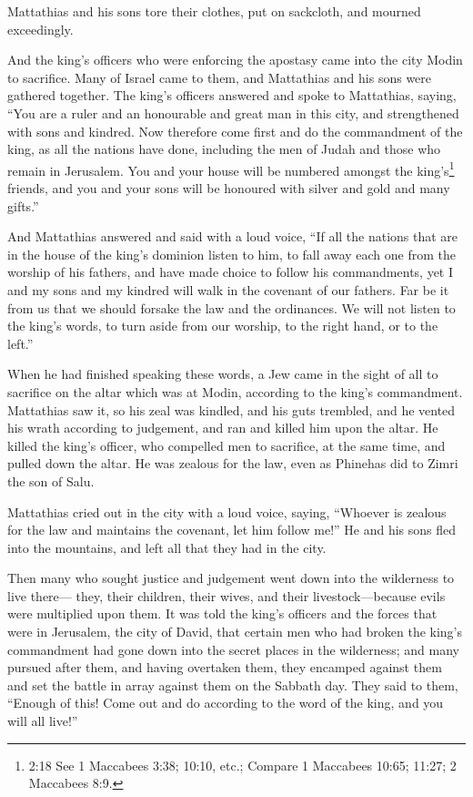  Mattathias and his sons tore their clothes, put on
sackcloth, and mourned exceedingly.

 And the king's officers who were enforcing the apostasy
came into the city Modin to sacrifice.  Many of Israel came
to them, and Mattathias and his sons were gathered together.
 The king's officers answered and spoke to Mattathias,
saying, ``You are a ruler and an honourable and great man in this city,
and strengthened with sons and kindred.  Now therefore come
first and do the commandment of the king, as all the nations have done,
including the men of Judah and those who remain in Jerusalem. You and
your house will be numbered amongst the king's\footnote{2:18 See 1
  Maccabees 3:38; 10:10, etc.; Compare 1 Maccabees 10:65; 11:27; 2
  Maccabees 8:9.} friends, and you and your sons will be honoured with
silver and gold and many gifts.''

 And Mattathias answered and said with a loud voice, ``If
all the nations that are in the house of the king's dominion listen to
him, to fall away each one from the worship of his fathers, and have
made choice to follow his commandments,  yet I and my sons
and my kindred will walk in the covenant of our fathers. 
Far be it from us that we should forsake the law and the ordinances.
 We will not listen to the king's words, to turn aside from
our worship, to the right hand, or to the left.''

 When he had finished speaking these words, a Jew came in
the sight of all to sacrifice on the altar which was at Modin, according
to the king's commandment.  Mattathias saw it, so his zeal
was kindled, and his guts trembled, and he vented his wrath according to
judgement, and ran and killed him upon the altar.  He
killed the king's officer, who compelled men to sacrifice, at the same
time, and pulled down the altar.  He was zealous for the
law, even as Phinehas did to Zimri the son of Salu.

 Mattathias cried out in the city with a loud voice,
saying, ``Whoever is zealous for the law and maintains the covenant, let
him follow me!''  He and his sons fled into the mountains,
and left all that they had in the city.

 Then many who sought justice and judgement went down into
the wilderness to live there---  they, their children,
their wives, and their livestock---because evils were multiplied upon
them.  It was told the king's officers and the forces that
were in Jerusalem, the city of David, that certain men who had broken
the king's commandment had gone down into the secret places in the
wilderness;  and many pursued after them, and having
overtaken them, they encamped against them and set the battle in array
against them on the Sabbath day.  They said to them,
``Enough of this! Come out and do according to the word of the king, and
you will all live!''

